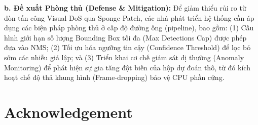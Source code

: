 \documentclass[a4paper,fleqn]{cas-dc}
\begin{document}
\textbf{b. Đề xuất Phòng thủ (Defense \& Mitigation):} Để giảm thiểu rủi
ro từ đòn tấn công Visual DoS qua Sponge Patch, các nhà phát triển hệ
thống cần áp dụng các biện pháp phòng thủ ở cấp độ đường ống (pipeline),
bao gồm: (1) Cấu hình giới hạn số lượng Bounding Box tối đa (Max
Detections Cap) được phép đưa vào NMS; (2) Tối ưu hóa ngưỡng tin cậy
(Confidence Threshold) để lọc bỏ sớm các nhiễu giả lập; và (3) Triển
khai cơ chế giám sát dị thường (Anomaly Monitoring) để phát hiện sự gia
tăng đột biến của hộp dự đoán thô, từ đó kích hoạt chế độ thả khung hình
(Frame-dropping) bảo vệ CPU phần cứng.


\section*{Acknowledgement}

\printcredits
\end{document}
